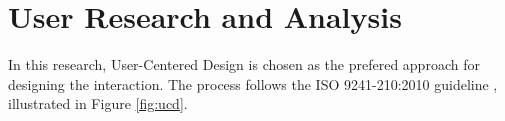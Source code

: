 \documentclass[conference]{IEEEtran}
\begin{document}



\section{User Research and Analysis}


In this research, User-Centered Design is chosen as the prefered approach for designing the interaction. The process follows the ISO 9241-210:2010 guideline \cite{iso9241-210:2010}, illustrated in Figure \ref{fig:ucd}.
\end{document}
